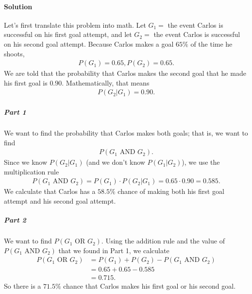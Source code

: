 \documentclass[letterpaper,10pt,english]{jupyterBook}
\begin{document}
\paragraph{Solution}
\label{\detokenize{Ch3 Probability/3.4 Addition Rules and Mutually Exclusive Events:solution}}
\sphinxAtStartPar
Let’s first translate this problem into math. Let \(G_1 = \) the event Carlos is successful on his first goal attempt, and let \(G_2 = \) the event Carlos is successful on his second goal attempt. Because Carlos makes a goal \(65\%\) of the time he shoots,
\begin{equation*}
\begin{split} P(G_1) = 0.65, P(G_2) = 0.65.\end{split}
\end{equation*}
\sphinxAtStartPar
We are told that the probability that Carlos makes the second goal  that he made his first goal is \(0.90\). Mathematically, that means
\begin{equation*}
\begin{split} P(G_2|G_1) = 0.90. \end{split}
\end{equation*}

\subparagraph{Part 1}
\label{\detokenize{Ch3 Probability/3.4 Addition Rules and Mutually Exclusive Events:part-1}}
\sphinxAtStartPar
We want to find the probability that Carlos makes both goals; that is, we want to find
\begin{equation*}
\begin{split} P(G_1 \text{ AND } G_2). \end{split}
\end{equation*}
\sphinxAtStartPar
Since we know \(P(G_2|G_1)\) (and we don’t know \(P(G_1|G_2)\)), we use the multiplication rule
\begin{equation*}
\begin{split}P(G_1 \text{ AND } G_2) = P(G_1) \cdot P(G_2|G_1) = 0.65 \cdot 0.90 = 0.585.\end{split}
\end{equation*}
\sphinxAtStartPar
We calculate that Carlos has a \(58.5\%\) chance of making both his first goal attempt and his second goal attempt.


\subparagraph{Part 2}
\label{\detokenize{Ch3 Probability/3.4 Addition Rules and Mutually Exclusive Events:part-2}}
\sphinxAtStartPar
We want to find \(P(G_1 \text{ OR } G_2)\). Using the addition rule and the value of \(P(G_1 \text{ AND } G_2)\) that we found in Part 1, we calculate
\begin{align*}
P(G_1 \text{ OR } G_2) &= P(G_1) + P(G_2) - P(G_1 \text{ AND } G_2) \\
&= 0.65 + 0.65 - 0.585 \\
&= 0.715.
\end{align*}
\sphinxAtStartPar
So there is a \(71.5\%\) chance that Carlos makes his first goal or his second goal.
\end{document}
